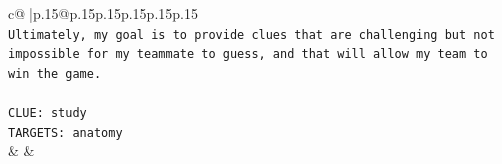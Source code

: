 \documentclass{article}
\begin{document}
{\begin{supertabular}{c@{$\;$}|p{.15\linewidth}@{}p{.15\linewidth}p{.15\linewidth}p{.15\linewidth}p{.15\linewidth}p{.15\linewidth}}
{{{\\ 
\texttt{Ultimately, my goal is to provide clues that are challenging but not impossible for my teammate to guess, and that will allow my team to win the game.} \\
\\ 
\texttt{CLUE: study} \\
\texttt{TARGETS: anatomy} \\
            }
        }
    }
    & & \\ \\

\end{supertabular}
}
\end{document}
